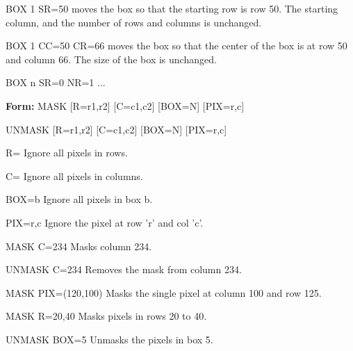 {\newpage\clearpage
{}%
\begin{example}
  \item[BOX 1 SR=50\hfill]{moves the box so that the starting row is row 50. 
       The starting column, and the number of rows and columns is unchanged.}
  \item[BOX 1 CC=50 CR=66\hfill]{moves the box so that the center of the box 
       is at row 50 and column 66.  The size of the box is unchanged.}
\end{example}%
\lthtmlfigureZ
\lthtmlcheckvsize\clearpage}

{\newpage\clearpage
{}%
\begin{hanging}
  \item{BOX n SR=0 NR=1 ...}
\end{hanging}%
\lthtmlfigureZ
\lthtmlcheckvsize\clearpage}

{\newpage\clearpage
{}%
\begin{command}
  \item[\textbf{Form:} MASK {[R=r1,r2]} {[C=c1,c2]} {[BOX=N]} 
       {[PIX=r,c]}\hfill]{}
  \item[UNMASK  {[R=r1,r2]} {[C=c1,c2]} {[BOX=N]} {[PIX=r,c]}\hfill]{}
  \item[R=]{Ignore all pixels in rows.}
  \item[C=]{Ignore all pixels in columns.}
  \item[BOX=b]{Ignore all pixels in box b.}
  \item[PIX=r,c]{Ignore the pixel at row 'r' and col 'c'.}
\end{command}%
\lthtmlfigureZ
\lthtmlcheckvsize\clearpage}

{\newpage\clearpage
{}%
\begin{example}
  \item[MASK C=234\hfill]{Masks column 234.}
  \item[UNMASK C=234\hfill]{Removes the mask from column 234.}
  \item[MASK PIX=(120,100)\hfill]{Masks the single pixel at
column 100 and row 125.}
  \item[MASK R=20,40\hfill]{Masks pixels in rows 20 to 40.}
  \item[UNMASK BOX=5\hfill]{Unmasks the pixels in box 5.}
\end{example}%
\lthtmlfigureZ
\lthtmlcheckvsize\clearpage}

